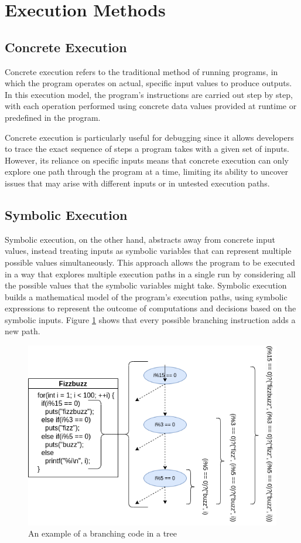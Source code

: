 \section{Execution Methods}
\subsection{Concrete Execution}
Concrete execution refers to the traditional method of running programs, in which the program operates on actual, specific input values to produce outputs.
In this execution model, the program's instructions are carried out step by step, with each operation performed using concrete data values provided at runtime or predefined in the program. 

Concrete execution is particularly useful for debugging since it allows developers to trace the exact sequence of steps a program takes with a given set of inputs.
However, its reliance on specific inputs means that concrete execution can only explore one path through the program at a time, limiting its ability to uncover issues that may arise with different inputs or in untested execution paths.

\subsection{Symbolic Execution}
Symbolic execution, on the other hand, abstracts away from concrete input values, instead treating inputs as symbolic variables that can represent multiple possible values simultaneously. 
This approach allows the program to be executed in a way that explores multiple execution paths in a single run by considering all the possible values that the symbolic variables might take. 
Symbolic execution builds a mathematical model of the program's execution paths, using symbolic expressions to represent the outcome of computations and decisions based on the symbolic inputs. 
Figure \ref{fig:sym_tree} shows that every possible branching instruction adds a new path.
\begin{figure}[ht]
    \centering
    \includegraphics[width=0.8\linewidth]{figures/sym_trans}
    \caption[Branching in symbolic execution]{An example of a branching code in a tree}
    \label{fig:sym_tree}
\end{figure}

